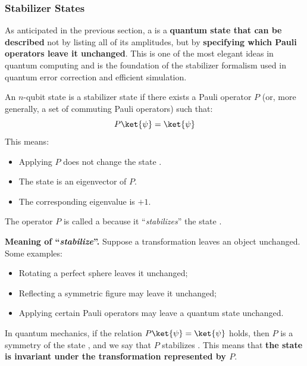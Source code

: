 \subsubsection{Stabilizer States}

As anticipated in the previous section, a  is a \textbf{quantum state that can be described} not by listing all of its amplitudes, but by \textbf{specifying which Pauli operators leave it unchanged}. This is one of the most elegant ideas in quantum computing and is the foundation of the stabilizer formalism used in quantum error correction and efficient simulation.

\begin{definitionbox}
    An $n$-qubit state \ket{\psi} is a stabilizer state if there exists a Pauli operator $P$ (or, more generally, a set of commuting Pauli operators) such that:
    \begin{equation}\label{eq:stabilizer-state}
        P\ket{\psi} = \ket{\psi}
    \end{equation}
    This means:
    \begin{itemize}
        \item Applying $P$ does not change the state \ket{\psi}.
        \item The state \ket{\psi} is an eigenvector of $P$.
        \item The corresponding eigenvalue is $+1$.
    \end{itemize}
    The operator $P$ is called a  because it ``\emph{stabilizes}'' the state \ket{\psi}.
\end{definitionbox}

\noindent
\textcolor{Green3}{ \textbf{Meaning of ``\emph{stabilize}''.}} Suppose a transformation leaves an object unchanged. Some examples:
\begin{itemize}
    \item Rotating a perfect sphere leaves it unchanged;
    \item Reflecting a symmetric figure may leave it unchanged;
    \item Applying certain Pauli operators may leave a quantum state unchanged.
\end{itemize}
In quantum mechanics, if the relation $P\ket{\psi} = \ket{\psi}$ holds, then $P$ is a symmetry of the state \ket{\psi}, and we say that $P$ stabilizes \ket{\psi}. This means that \textbf{the state \ket{\psi} is invariant under the transformation represented by $P$}.

